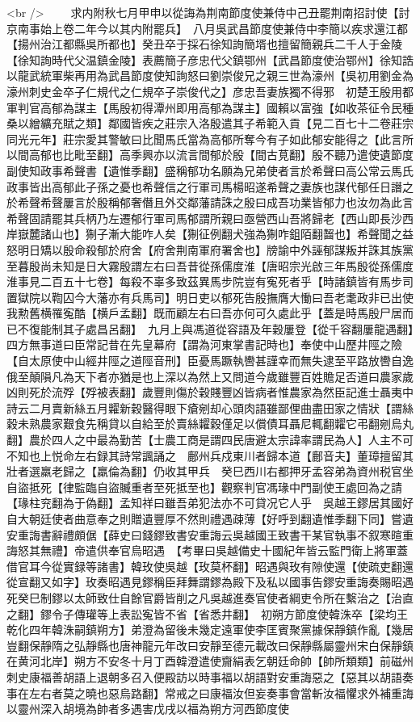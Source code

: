 <br />
　　求内附秋七月甲申以從誨為荆南節度使兼侍中己丑罷荆南招討使【討京南事始上卷二年今以其内附罷兵】　八月吳武昌節度使兼侍中李簡以疾求還江都【揚州治江都縣吳所都也】癸丑卒于採石徐知詢簡壻也擅留簡親兵二千人于金陵【徐知詢時代父温鎮金陵】表薦簡子彦忠代父鎮鄂州【武昌節度使治鄂州】徐知誥以龍武統軍柴再用為武昌節度使知詢怒曰劉崇俊兄之親三世為濠州【吳初用劉金為濠州刺史金卒子仁規代之仁規卒子崇俊代之】彦忠吾妻族獨不得邪　初楚王殷用都軍判官高郁為謀主【馬殷初得潭州即用高郁為謀主】國賴以富強【如收茶征令民種桑以繒纊充賦之類】鄰國皆疾之莊宗入洛殷遣其子希範入貢【見二百七十二卷莊宗同光元年】莊宗愛其警敏曰比聞馬氏當為高郁所奪今有子如此郁安能得之【此言所以間高郁也比毗至翻】高季興亦以流言間郁於殷【間古莧翻】殷不聽乃遣使遺節度副使知政事希聲書【遺惟季翻】盛稱郁功名願為兄弟使者言於希聲曰高公常云馬氏政事皆出高郁此子孫之憂也希聲信之行軍司馬楊昭遂希聲之妻族也謀代郁任日譖之於希聲希聲屢言於殷稱郁奢僭且外交鄰藩請誅之殷曰成吾功業皆郁力也汝勿為此言希聲固請罷其兵柄乃左遷郁行軍司馬郁謂所親曰亟營西山吾將歸老【西山即長沙西岸嶽麓諸山也】猘子漸大能咋人矣【猘征例翻犬強為猘咋鉏陌翻齧也】希聲聞之益怒明日矯以殷命殺郁於府舍【府舍荆南軍府署舍也】牓諭中外誣郁謀叛并誅其族黨至暮殷尚未知是日大霧殷謂左右曰吾昔從孫儒度淮【唐昭宗光啟三年馬殷從孫儒度淮事見二百五十七卷】每殺不辜多致茲異馬步院豈有寃死者乎【時諸鎮皆有馬步司置獄院以鞫囚今大藩亦有兵馬司】明日吏以郁死告殷撫膺大慟曰吾老耄政非已出使我勲舊横罹寃酷【横戶孟翻】既而顧左右曰吾亦何可久處此乎【蓋是時馬殷尸居而已不復能制其子處昌呂翻】　九月上與馮道從容語及年穀屢登【從千容翻屢龍遇翻】四方無事道曰臣常記昔在先皇幕府【謂為河東掌書記時也】奉使中山歷井陘之險【自太原使中山經井陘之道陘音刑】臣憂馬蹶執轡甚謹幸而無失逮至平路放轡自逸俄至顛隕凡為天下者亦猶是也上深以為然上又問道今歲雖豐百姓贍足否道曰農家歲凶則死於流殍【殍被表翻】歲豐則傷於穀賤豐凶皆病者惟農家為然臣記進士聶夷中詩云二月賣新絲五月糶新穀醫得眼下瘡剜却心頭肉語雖鄙俚曲盡田家之情狀【謂絲穀未熟農家艱食先稱貸以自給至於賣絲糶穀僅足以償債耳聶尼輒翻糶它弔翻剜烏丸翻】農於四人之中最為勤苦【士農工商是謂四民唐避太宗諱率謂民為人】人主不可不知也上悦命左右録其詩常諷誦之　鄜州兵戍東川者歸本道【鄜音夫】董璋擅留其壯者選羸老歸之【羸倫為翻】仍收其甲兵　癸巳西川右都押牙孟容弟為資州税官坐自盜抵死【律監臨自盜贓重者至死抵至也】觀察判官馮瑑中門副使王處回為之請【瑑柱兖翻為于偽翻】孟知祥曰雖吾弟犯法亦不可貸况它人乎　吳越王鏐居其國好自大朝廷使者曲意奉之則贈遺豐厚不然則禮遇疎薄【好呼到翻遺惟季翻下同】嘗遺安重誨書辭禮頗倨【薛史曰錢鏐致書安重誨云吳越國王致書干某官執事不叙寒暄重誨怒其無禮】帝遣供奉官烏昭遇　【考畢曰吳越備史十國紀年皆云監門衛上將軍蓋借官耳今從實録等諸書】韓玫使吳越【玫莫杯翻】昭遇與玫有隙使還【使疏吏翻還從宣翻又如字】玫奏昭遇見鏐稱臣拜舞謂鏐為殿下及私以國事告鏐安重誨奏賜昭遇死癸巳制鏐以太師致仕自餘官爵皆削之凡吳越進奏官使者綱吏令所在繫治之【治直之翻】鏐令子傳瓘等上表訟寃皆不省【省悉井翻】　初朔方節度使韓洙卒【梁均王乾化四年韓洙嗣鎮朔方】弟澄為留後未幾定遠軍使李匡賓聚黨據保靜鎮作亂【幾居豈翻保靜隋之弘靜縣也唐神龍元年改曰安靜至德元載改曰保靜縣屬靈州宋白保靜鎮在黄河北岸】朔方不安冬十月丁酉韓澄遣使齎絹表乞朝廷命帥【帥所類類】前磁州刺史康福善胡語上退朝多召入便殿訪以時事福以胡語對安重誨惡之【惡其以胡語奏事在左右者莫之曉也惡烏路翻】常戒之曰康福汝但妄奏事會當斬汝福懼求外補重誨以靈州深入胡境為帥者多遇害戊戌以福為朔方河西節度使